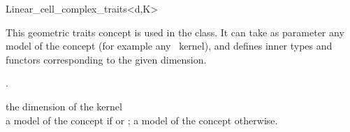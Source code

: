 \ccRefPageBegin

\begin{ccRefClass}{Linear_cell_complex_traits<d,K>}


\ccDefinition

This geometric traits concept is used in the
 class.  It can take as parameter any model of the
concept  (for example any \cgal\ kernel), and defines inner
types and functors corresponding to the given dimension.

\ccIsModel
{}

\ccInheritsFrom
{}.

\ccParameters
{} the dimension of the kernel\\
 a model of the concept  if  or 
 ; a model of the concept  otherwise. 

\ccConstants
{}


\ccSeeAlso

\\

\end{ccRefClass}
\ccRefPageEnd





